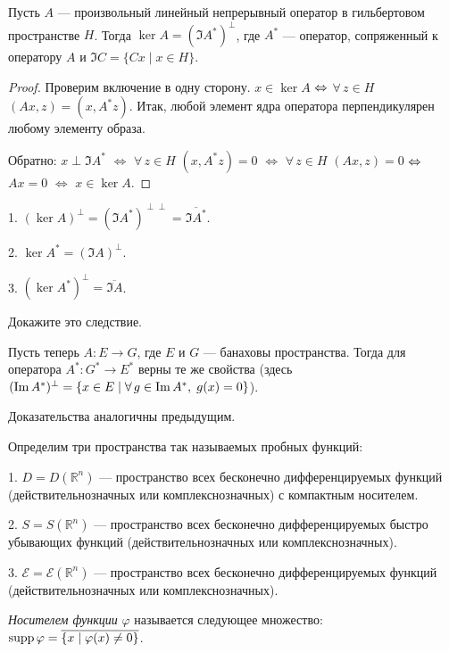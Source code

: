\documentclass[12pt,titlepage, a4paper]{article}
\begin{document}
\begin{theorem}
Пусть $A$ --- произвольный линейный непрерывный оператор в
гильбертовом пространстве $H$. Тогда $\ker A=(\Im A^*)^{\perp}$, где
$A^*$ --- оператор, сопряженный к оператору $A$ и $\Im C=\{Cx\mid
x\in H\}$.
\end{theorem}

\begin{proof}
Проверим включение в одну сторону. $x\in \ker A$ $\p\Leftrightarrow$
$\forall\, z\in H$ \;\;$(Ax,z)=(x,A^*z)$. Итак, любой элемент ядра
оператора перпендикулярен любому элементу образа.

Обратно: $x\perp \Im A^*$ $\Leftrightarrow$ $\forall\, z\in H$\;\;
$(x,A^*z)=0$ $\Leftrightarrow$ $\forall\, z\in H$ \;\;$(Ax,z)=0$
$\p\Leftrightarrow$ $Ax=0$ $\Leftrightarrow$ $x\in \ker A$.
\end{proof}

\begin{sled}
1. $(\ker A)^{\perp}=(\Im A^*)^{\perp\perp}=\overline{\Im A^*}$.

2. $\ker A^*=(\Im A)^{\perp}$.

3. $(\ker A^*)^{\perp}=\overline{\Im A}$.
\end{sled}

\begin{upr}
Докажите это следствие.
\end{upr}

Пусть теперь $A\colon E\to G$, где $E$ и $G$ --- банаховы
пространства. Тогда для оператора $A^*\colon G^*\to E^*$ верны те же
свойства (здесь $(\Im A^*)^{\perp}=\{x\p\in E\mid\forall\, g\p\in
\Im A^*,\; g(x)=0\}$).

Доказательства аналогичны предыдущим.


Определим три пространства так называемых пробных функций:

1. $D=D(\mathbb{R}^n)$ --- пространство всех бесконечно
дифференцируемых функций (действительнозначных или
комплекснозначных) с компактным носителем.

2. $S=S(\mathbb{R}^n)$ --- пространство всех бесконечно
дифференцируемых быстро убывающих функций (действительнозначных или
комплекснозначных).

3. $\mathcal{E}=\mathcal{E}(\mathbb{R}^n)$ --- пространство всех
бесконечно дифференцируемых функций (действительнозначных или
комплекснозначных).

\begin{defen}
\emph{Носителем функции} $\varphi$ называется следующее множество:
$\mathop{\mathrm{supp}}\varphi=\overline{\{x\mid \varphi(x)\neq0\}}$.
\end{defen}
\end{document}
